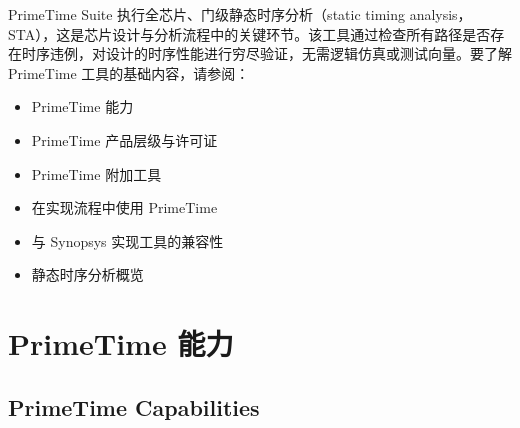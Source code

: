 \label{chap:intro}

PrimeTime Suite 执行全芯片、门级静态时序分析（static timing analysis，STA），这是芯片设计与分析流程中的关键环节。该工具通过检查所有路径是否存在时序违例，对设计的时序性能进行穷尽验证，无需逻辑仿真或测试向量。要了解 PrimeTime 工具的基础内容，请参阅：
\begin{itemize}
  \item PrimeTime 能力
  \item PrimeTime 产品层级与许可证
  \item PrimeTime 附加工具
  \item 在实现流程中使用 PrimeTime
  \item 与 Synopsys 实现工具的兼容性
  \item 静态时序分析概览
\end{itemize}

\section{PrimeTime 能力}
\subsection*{PrimeTime Capabilities}

